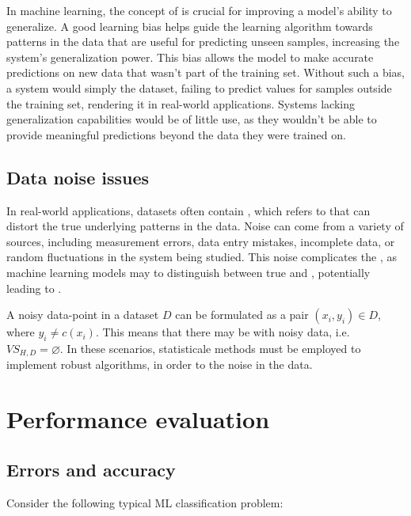 \documentclass[a4paper, 12pt]{report}
\begin{document}
    In machine learning, the concept of  is crucial for improving a model's ability to generalize. A good learning bias helps guide the learning algorithm towards patterns in the data that are useful for predicting unseen samples, increasing the system's generalization power. This bias allows the model to make accurate predictions on new data that wasn't part of the training set. Without such a bias, a system would simply  the dataset, failing to predict values for samples outside the training set, rendering it  in real-world applications. Systems lacking generalization capabilities would be of little use, as they wouldn't be able to provide meaningful predictions beyond the data they were trained on.

    \subsection{Data noise issues}

    In real-world applications, datasets often contain , which refers to  that can distort the true underlying patterns in the data. Noise can come from a variety of sources, including measurement errors, data entry mistakes, incomplete data, or random fluctuations in the system being studied. This noise complicates the , as machine learning models may  to distinguish between true  and , potentially leading to .

    A noisy data-point in a dataset $D$ can be formulated as a pair $(x_i, y_i) \in D$, where $y_i \neq c(x_i)$. This means that there may be  with noisy data, i.e. $VS_{H, D} = \varnothing$. In these scenarios, statisticale methods must be employed to implement robust algorithms, in order to  the noise in the data.

    \section{Performance evaluation}

    \subsection{Errors and accuracy}

    Consider the following typical ML classification problem:
\end{document}
